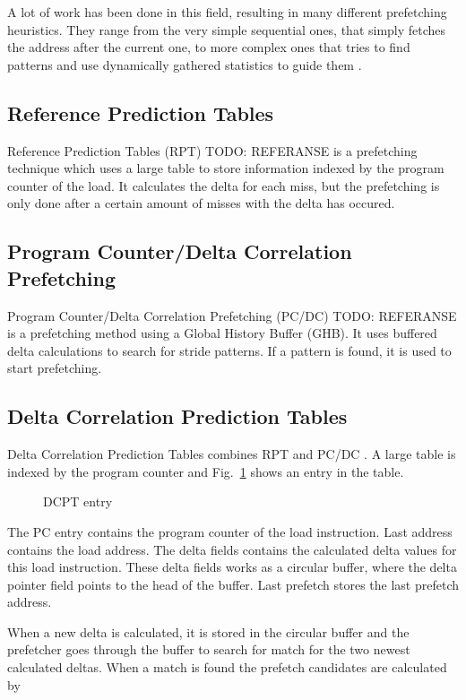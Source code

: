 A lot of work has been done in this field, resulting in many different prefetching heuristics. They
range from the very simple sequential ones, that simply fetches the address after the current one,
to more complex ones that tries to find patterns and use dynamically gathered statistics to guide
them \cite{prefetch_range}.

\subsection{Reference Prediction Tables}
Reference Prediction Tables (RPT) TODO: REFERANSE is a prefetching technique which uses a large table to store
information indexed by the program counter of the load. It calculates the delta for each miss, but
the prefetching is only done after a certain amount of misses with the delta has occured.

\subsection{Program Counter/Delta Correlation Prefetching}
Program Counter/Delta Correlation Prefetching (PC/DC) TODO: REFERANSE is a prefetching method using a Global History
Buffer (GHB). It uses buffered delta calculations to search for stride patterns. If a pattern is
found, it is used to start prefetching.

\subsection{Delta Correlation Prediction Tables} 
Delta Correlation Prediction Tables combines RPT and PC/DC \cite{dcpt}. A large table is indexed by
the program counter and Fig.~\ref{fig:dcpt_entry} shows an entry in the table.
\begin{figure}[h]
	\begin{center}
	\end{center}
	\caption{DCPT entry\label{fig:dcpt_entry}}
\end{figure}
The PC entry contains the program counter of the load instruction. Last address contains the load
address. The delta fields contains the calculated delta values for this load instruction. These
delta fields works as a circular buffer, where the delta pointer field points to the head of the
buffer. Last prefetch stores the last prefetch address. 

When a new delta is calculated, it is stored in the circular buffer and the prefetcher goes through
the buffer to search for match for the two newest calculated deltas. When a match is found the
prefetch candidates are calculated by
